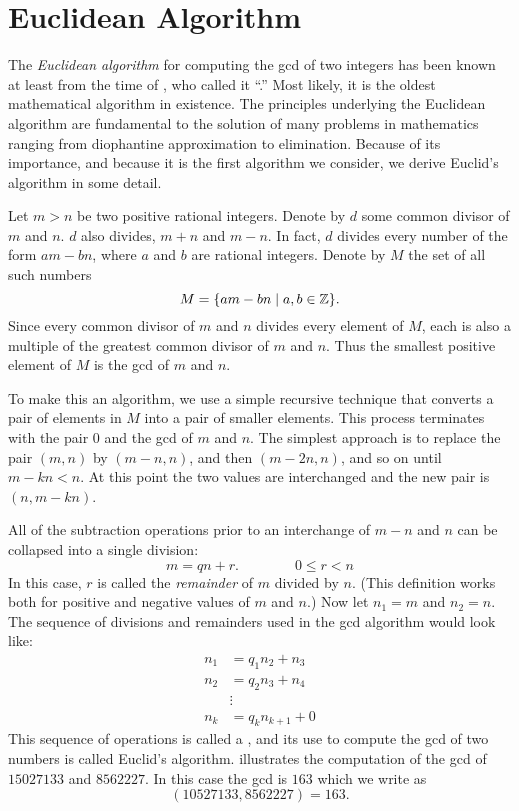 \section{Euclidean Algorithm}
\label{Integer:Euclidean:Sec}

The {\em Euclidean algorithm} for computing the {\sc gcd} of two
integers has been known at least from the time of 
\cite{Euclidean:Algorithm}, who called it ``.''  Most
likely, it is the oldest mathematical algorithm in existence.  The
principles underlying the Euclidean algorithm are fundamental to the
solution of many problems in mathematics ranging from diophantine
approximation to elimination.  Because of its importance, and because
it is the first algorithm we consider, we derive Euclid's algorithm in
some detail.

Let $m > n$ be two positive rational integers.  Denote by $d$ some
common divisor of $m$ and $n$.  $d$ also divides, $m+n$ and $m-n$.  In
fact, $d$ divides every number of the form $am - bn$, where $a$ and
$b$ are rational integers.  Denote by $M$ the set of all such numbers
\[
M = \{ am - bn \mid a,b \in \mathbb{Z}\}.
\]
Since every common divisor of $m$ and $n$ divides every element of
$M$, each is also a multiple of the greatest common divisor of $m$ and
$n$.  Thus the smallest positive element of $M$ is the {\sc gcd} of $m$ and
$n$.

To make this an algorithm, we use a simple recursive technique that
converts a pair of elements in $M$ into a pair of smaller elements.
This process terminates with the pair $0$ and the {\sc gcd} of $m$ and
$n$.  The simplest approach is to replace the pair $(m,n)$ by
$(m-n,n)$, and then $(m-2n, n)$, and so on until $m-kn < n$.  At this
point the two values are interchanged and the new pair is $(n, m-kn)$.

All of the subtraction operations prior to an interchange of $m-n$ and
$n$ can be collapsed into a single division:
\begin{equation}
m = q n + r.\qquad\qquad 0 \le r < n 
\label{Remainder:Eq}
\end{equation}
In this case, $r$ is called the {\it remainder} of $m$ divided by $n$.
(This definition works both for positive and negative values of $m$
and $n$.)  Now let $n_1 = m$ and $n_2 = n$.  The sequence of
divisions and remainders used in the {\sc gcd} algorithm would look like:
\begin{equation} \label{Int:RemainderSeq:Eq}
  \begin{aligned}
   n_1 &= q_1 n_2 + n_3\\
   n_2&=q_2 n_3 + n_4\\
     &\vdots\\
   n_k& = q_k n_{k+1} + 0
  \end{aligned}
\end{equation}
This sequence of operations is called a , and
its use to compute the {\sc gcd} of two numbers is called Euclid's
algorithm.   illustrates the computation of
the {\sc gcd} of $15027133$ and $8562227$.  In this case the {\sc
gcd} is $163$ which we write as 
\[
(10527133, 8562227) = 163.
\]

